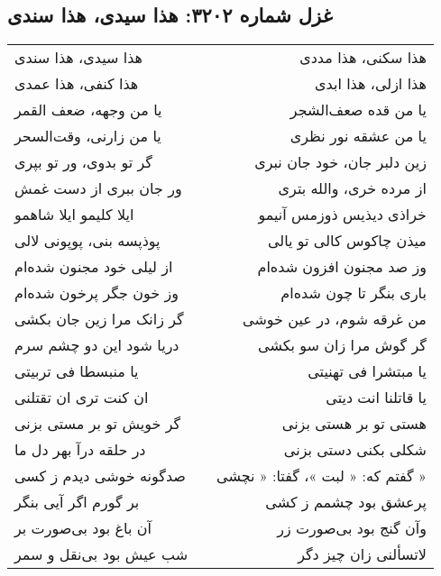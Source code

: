 \begin{center}
\section*{غزل شماره ۳۲۰۲: هذا سیدی، هذا سندی}
\label{sec:3202}
\begin{longtable}{l p{0.5cm} r}
هذا سیدی، هذا سندی
&&
هذا سکنی، هذا مددی
\\
هذا کنفی، هذا عمدی
&&
هذا ازلی، هذا ابدی
\\
یا من وجهه، ضعف القمر
&&
یا من قده صعف‌الشجر
\\
یا من زارنی، وقت‌السحر
&&
یا من عشقه نور نظری
\\
گر تو بدوی، ور تو بپری
&&
زین دلبر جان، خود جان نبری
\\
ور جان ببری از دست غمش
&&
از مرده خری، والله بتری
\\
ایلا کلیمو ایلا شاهمو
&&
خراذی دیذیس ذوزمس آنیمو
\\
پوذپسه بنی، پوپونی لالی
&&
میذن چاکوس کالی تو یالی
\\
از لیلی خود مجنون شده‌ام
&&
وز صد مجنون افزون شده‌ام
\\
وز خون جگر پرخون شده‌ام
&&
باری بنگر تا چون شده‌ام
\\
گر زانک مرا زین جان بکشی
&&
من غرقه شوم، در عین خوشی
\\
دریا شود این دو چشم سرم
&&
گر گوش مرا زان سو بکشی
\\
یا منبسطا فی تربیتی
&&
یا مبتشرا فی تهنیتی
\\
ان کنت تری ان تقتلنی
&&
یا قاتلنا انت دیتی
\\
گر خویش تو بر مستی بزنی
&&
هستی تو بر هستی بزنی
\\
در حلقه درآ بهر دل ما
&&
شکلی بکنی دستی بزنی
\\
صدگونه خوشی دیدم ز کسی
&&
گفتم که: « لبت »، گفتا: « نچشی »
\\
بر گورم اگر آیی بنگر
&&
پرعشق بود چشمم ز کشی
\\
آن باغ بود بی‌صورت بر
&&
وآن گنج بود بی‌صورت زر
\\
شب عیش بود بی‌نقل و سمر
&&
لاتسألنی زان چیز دگر
\\
\end{longtable}
\end{center}
